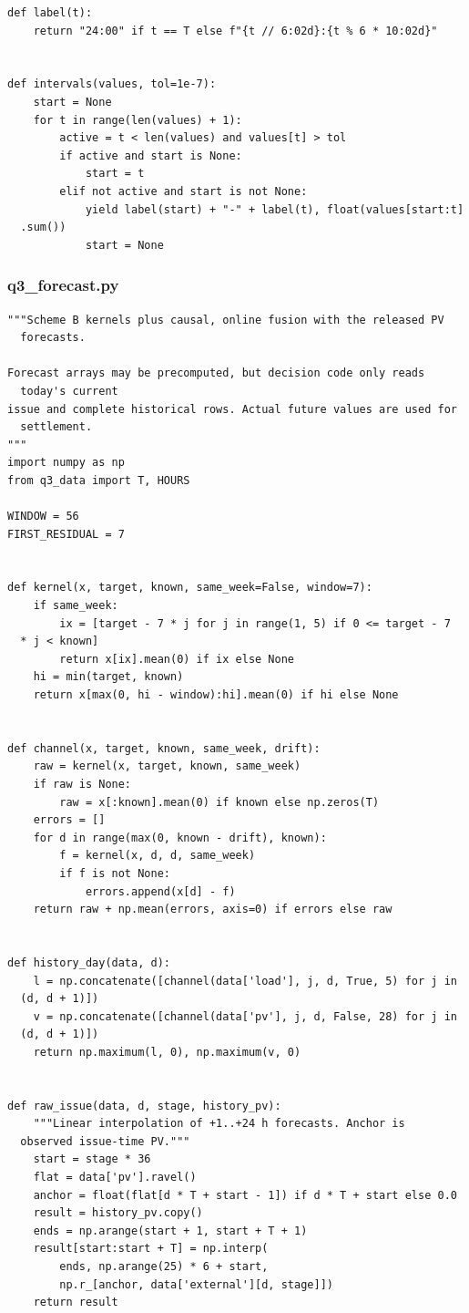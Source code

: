 \begin{verbatim}
def label(t):
    return "24:00" if t == T else f"{t // 6:02d}:{t % 6 * 10:02d}"


def intervals(values, tol=1e-7):
    start = None
    for t in range(len(values) + 1):
        active = t < len(values) and values[t] > tol
        if active and start is None:
            start = t
        elif not active and start is not None:
            yield label(start) + "-" + label(t), float(values[start:t]
  .sum())
            start = None
\end{verbatim}

\subsubsection*{q3\_forecast.py}
\begin{verbatim}
"""Scheme B kernels plus causal, online fusion with the released PV
  forecasts.

Forecast arrays may be precomputed, but decision code only reads
  today's current
issue and complete historical rows. Actual future values are used for
  settlement.
"""
import numpy as np
from q3_data import T, HOURS

WINDOW = 56
FIRST_RESIDUAL = 7


def kernel(x, target, known, same_week=False, window=7):
    if same_week:
        ix = [target - 7 * j for j in range(1, 5) if 0 <= target - 7
  * j < known]
        return x[ix].mean(0) if ix else None
    hi = min(target, known)
    return x[max(0, hi - window):hi].mean(0) if hi else None


def channel(x, target, known, same_week, drift):
    raw = kernel(x, target, known, same_week)
    if raw is None:
        raw = x[:known].mean(0) if known else np.zeros(T)
    errors = []
    for d in range(max(0, known - drift), known):
        f = kernel(x, d, d, same_week)
        if f is not None:
            errors.append(x[d] - f)
    return raw + np.mean(errors, axis=0) if errors else raw


def history_day(data, d):
    l = np.concatenate([channel(data['load'], j, d, True, 5) for j in
  (d, d + 1)])
    v = np.concatenate([channel(data['pv'], j, d, False, 28) for j in
  (d, d + 1)])
    return np.maximum(l, 0), np.maximum(v, 0)


def raw_issue(data, d, stage, history_pv):
    """Linear interpolation of +1..+24 h forecasts. Anchor is
  observed issue-time PV."""
    start = stage * 36
    flat = data['pv'].ravel()
    anchor = float(flat[d * T + start - 1]) if d * T + start else 0.0
    result = history_pv.copy()
    ends = np.arange(start + 1, start + T + 1)
    result[start:start + T] = np.interp(
        ends, np.arange(25) * 6 + start,
        np.r_[anchor, data['external'][d, stage]])
    return result



\end{verbatim}

